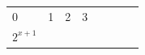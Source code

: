 {{\begin{center}
\begin{xtabular}[t]{|l|l|l|l|l|l|l|l|}
    
        0 &
    
    
        1 &
    
    
        2 &
    
    
        3%
     \tabularnewline{}
    
    
        
                \begin{math}{2}^{x+1}\end{math}
               &
    
    
         &
    
    
         &
    
    
         &
    

\end{xtabular}
\end{center}}}
